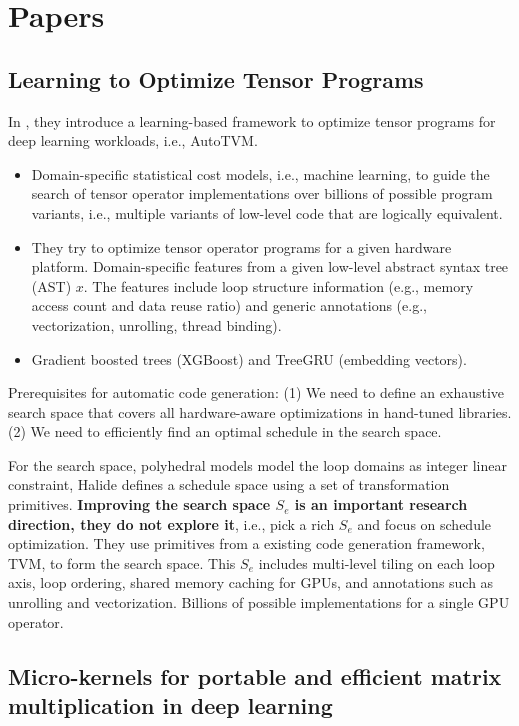 \section{Papers}\label{sec:papers}
\subsection{Learning to Optimize Tensor Programs}
In \cite{Chen2018LearningTO}, they introduce a learning-based framework to optimize tensor programs for deep learning workloads, i.e., AutoTVM.
\begin{itemize}
    \item Domain-specific statistical cost models, i.e., machine learning, to guide the search of tensor operator implementations over billions of possible program variants, i.e., multiple variants of low-level code that are logically equivalent.
    \item They try to optimize tensor operator programs for a given hardware platform. Domain-specific features from a given low-level abstract syntax tree (AST) $x$. The features include loop structure information (e.g., memory access count and data reuse ratio) and generic annotations (e.g., vectorization, unrolling, thread binding).
    \item Gradient boosted trees (XGBoost) and TreeGRU (embedding vectors).
\end{itemize}
Prerequisites for automatic code generation: (1) We need to define an exhaustive search space that covers all hardware-aware optimizations in hand-tuned libraries. (2) We need to efficiently find an optimal schedule in the search space. 

For the search space, polyhedral models \cite{Bondhugula2008APA} model the loop domains as integer linear constraint, Halide \cite{RaganKelley2013HalideAL} defines a schedule space using a set of transformation primitives. \textbf{Improving the search space $S_e$ is an important research direction, they do not explore it}, i.e., pick a rich $S_e$ and focus on schedule optimization. They use primitives from a existing code generation framework, TVM, to form the search space. This $S_e$ includes multi-level tiling on each loop axis, loop ordering, shared memory caching for GPUs, and annotations such as unrolling and vectorization. Billions of possible implementations for a single GPU operator.

\subsection{Micro-kernels for portable and efficient matrix multiplication in deep learning}

